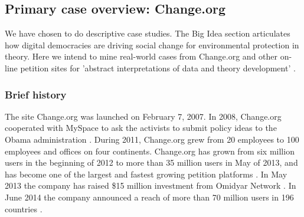 \subsection{Primary case overview: Change.org}
\label{sec:PlatformsOverview}
We have chosen to do descriptive case studies. The Big Idea section articulates how digital democracies are driving social change for environmental protection in theory. Here we intend to mine real-world cases from Change.org and other on-line petition sites for 'abstract interpretations of data and theory development' \citep{casestudyResearch}.

\subsubsection{Brief history}
The site Change.org was launched on February 7, 2007. In 2008, Change.org cooperated with MySpace to ask the activists to submit policy ideas to the Obama administration \citep{Stirland2008}. During 2011, Change.org grew from 20 employees to 100 employees and offices on four continents\citep{Kristof2012}. Change.org has grown from six million users in the beginning of 2012 to more than 35 million users in May of 2013, and has become one of the largest and fastest growing petition platforms \citep{Empson2013}. In May 2013 the company has raised \$15 million investment from Omidyar Network \citep{Pozin2013}. In June 2014 the company announced a reach of more than 70 million users in 196 countries \citep{Change14a}. 

